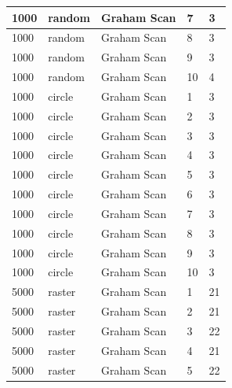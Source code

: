 \documentclass[12pt]{article}
\begin{document}
\begin{longtable}{|l|l|l|l|l|}
1000         & random            & Graham Scan & 7          & 3                             \\ \hline
1000         & random            & Graham Scan & 8          & 3                             \\ \hline
1000         & random            & Graham Scan & 9          & 3                             \\ \hline
1000         & random            & Graham Scan & 10         & 4                             \\ \hline
1000         & circle            & Graham Scan & 1          & 3                             \\ \hline
1000         & circle            & Graham Scan & 2          & 3                             \\ \hline
1000         & circle            & Graham Scan & 3          & 3                             \\ \hline
1000         & circle            & Graham Scan & 4          & 3                             \\ \hline
1000         & circle            & Graham Scan & 5          & 3                             \\ \hline
1000         & circle            & Graham Scan & 6          & 3                             \\ \hline
1000         & circle            & Graham Scan & 7          & 3                             \\ \hline
1000         & circle            & Graham Scan & 8          & 3                             \\ \hline
1000         & circle            & Graham Scan & 9          & 3                             \\ \hline
1000         & circle            & Graham Scan & 10         & 3                             \\ \hline
5000         & raster            & Graham Scan & 1          & 21                            \\ \hline
5000         & raster            & Graham Scan & 2          & 21                            \\ \hline
5000         & raster            & Graham Scan & 3          & 22                            \\ \hline
5000         & raster            & Graham Scan & 4          & 21                            \\ \hline
5000         & raster            & Graham Scan & 5          & 22                            \\ \hline

\end{longtable}
\end{document}
